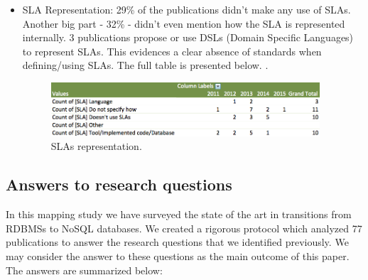 \documentclass{article}
\begin{document}
\begin{itemize}
\item{SLA Representation: }
29\% of the publications didn't make any use of SLAs. Another big part - 32\% - didn't even mention how the SLA is represented internally. 3 publications propose or use DSLs (Domain Specific Languages) to represent SLAs. This evidences a clear absence of standards when defining/using SLAs. The full table is presented below.  \cite{fullDBJson}.
\begin{figure}[htb!]
\centering
\includegraphics[width=100mm]{graph4.png}
\caption{SLAs representation.}
\end{figure}



\end{itemize}


\newpage

\subsection{Answers to research questions}

In this mapping study we have surveyed the state of the art in transitions from RDBMSs to NoSQL databases. We created a rigorous protocol which analyzed 77 publications to answer the research questions that we identified previously. We may consider the answer to these questions as the main outcome of this paper. The answers are summarized below:
\\
\end{document}
